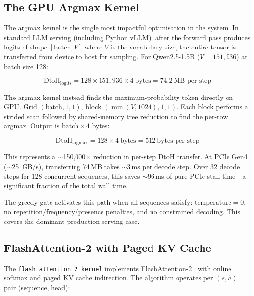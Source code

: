 \subsection{The GPU Argmax Kernel}
\label{sec:argmax}

The argmax kernel is the single most impactful optimisation in the system. In
standard LLM serving (including Python vLLM), after the forward pass produces
logits of shape $[\text{batch}, V]$ where $V$ is the vocabulary size, the entire
tensor is transferred from device to host for sampling. For Qwen2.5-1.5B
($V\!=\!151{,}936$) at batch size 128:

\begin{equation}
  \text{DtoH}_{\text{logits}} = 128 \times 151{,}936 \times 4~\text{bytes} = 74.2~\text{MB per step}
\end{equation}

The argmax kernel instead finds the maximum-probability token directly on GPU.
Grid $(\text{batch}, 1, 1)$, block $(\min(V, 1024), 1, 1)$. Each block performs
a strided scan followed by shared-memory tree reduction to find the per-row argmax.
Output is $\text{batch} \times 4$ bytes:

\begin{equation}
  \text{DtoH}_{\text{argmax}} = 128 \times 4~\text{bytes} = 512~\text{bytes per step}
\end{equation}

This represents a $\sim$150{,}000$\times$ reduction in per-step DtoH transfer.
At PCIe Gen4 ($\sim$25~GB/s), transferring 74\,MB takes $\sim$3\,ms per decode
step. Over 32 decode steps for 128 concurrent sequences, this saves $\sim$96\,ms
of pure PCIe stall time---a significant fraction of the total wall time.

The greedy gate activates this path when all sequences satisfy: $\text{temperature}
= 0$, no repetition/frequency/presence penalties, and no constrained decoding.
This covers the dominant production serving case.

\subsection{FlashAttention-2 with Paged KV Cache}

The \texttt{flash\_attention\_2\_kernel} implements FlashAttention-2~\cite{dao2023flashattention2}
with online softmax and paged KV cache indirection. The algorithm operates per
$(s, h)$ pair (sequence, head):

